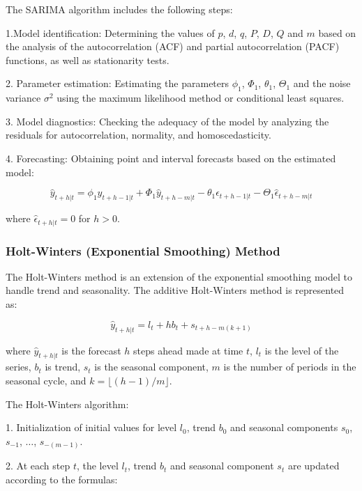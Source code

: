 The SARIMA algorithm includes the following steps:

1.Model identification: Determining the values of $p$, $d$, $q$, $P$, $D$, $Q$ and $m$ based on the analysis of the autocorrelation (ACF) and partial autocorrelation (PACF) functions, as well as stationarity tests.

2. Parameter estimation: Estimating the parameters $\phi_1$, $\Phi_1$, $\theta_1$, $\Theta_1$ and the noise variance $\sigma^2$ using the maximum likelihood method or conditional least squares.

3. Model diagnostics: Checking the adequacy of the model by analyzing the residuals for autocorrelation, normality, and homoscedasticity.

4. Forecasting: Obtaining point and interval forecasts based on the estimated model:

\begin{equation}
\hat{y}_{t+h|t} = \phi_1 \hat{y}_{t+h-1|t} + \Phi_1 \hat{y}_{t+h-m|t} - \theta_1 \hat{\epsilon}_{t+h-1|t} - \Theta_1 \hat{\epsilon}_{t+h-m|t}
\end{equation}

where $\hat{\epsilon}_{t+h|t} = 0$ for $h > 0$.

\subsubsection{Holt-Winters (Exponential Smoothing) Method}

The Holt-Winters method is an extension of the exponential smoothing model to handle trend and seasonality. The additive Holt-Winters method is represented as:

\begin{equation}
\hat{y}_{t+h|t} = l_t + h b_t + s_{t+h-m(k+1)}
\end{equation}

where $\hat{y}_{t+h|t}$ is the forecast $h$ steps ahead made at time $t$, $l_t$ is the level of the series, $b_t$ is trend, $s_t$ is the seasonal component, $m$ is the number of periods in the seasonal cycle, and $k = \lfloor(h-1)/m\rfloor$.

The Holt-Winters algorithm:

1. Initialization of initial values for level $l_0$, trend $b_0$ and seasonal components $s_0$, $s_{-1}$, $\ldots$, $s_{-(m-1)}$.

2. At each step $t$, the level $l_t$, trend $b_t$ and seasonal component $s_t$ are updated according to the formulas:

